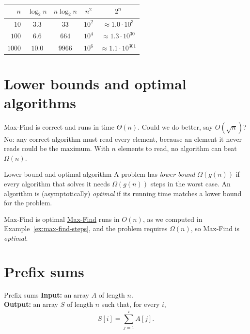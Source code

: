 \documentclass[a4paper,12pt,oneside]{report}
\begin{document}
\begin{center}
\begin{tabular}{rcccc}
  \toprule
  $n$ & $\log_2 n$ & $n\log_2 n$ & $n^2$ & $2^n$\\
  \midrule
  $10$   & $3.3$  & $33$    & $10^2$ & $\approx1.0\cdot10^{3}$\\
  $100$  & $6.6$  & $664$   & $10^4$ & $\approx1.3\cdot10^{30}$\\
  $1000$ & $10.0$ & $9966$  & $10^6$ & $\approx1.1\cdot10^{301}$\\
  \bottomrule
\end{tabular}
\end{center}

\section{Lower bounds and optimal algorithms}

Max-Find is correct and runs in time $\Theta(n)$. Could we do better,
say $O(\sqrt n)$? No: any correct algorithm must read every element,
because an element it never reads could be the maximum. With $n$
elements to read, no algorithm can beat $\Omega(n)$.

\begin{frameddefn}{Lower bound and optimal algorithm}
\label{def:optimal-algorithm}
A problem has \emph{lower bound} $\Omega(g(n))$ if every algorithm
that solves it needs $\Omega(g(n))$ steps in the worst case. An
algorithm is (asymptotically) \emph{optimal} if its running time
matches a lower bound for the problem.
\end{frameddefn}

\begin{framedexample}{Max-Find is optimal}\label{ex:max-find-optimal}
\hyperref[alg:max-find]{Max-Find} runs in $O(n)$, as we computed
in Example~\ref{ex:max-find-steps}, and the problem requires
$\Omega(n)$, so Max-Find is \emph{optimal}.
\end{framedexample}

\section{Prefix sums}

\begin{framedproblem}{Prefix sums}\label{prob:prefix-sums}
\textbf{Input:} an array $A$ of length $n$.\\
\textbf{Output:} an array $S$ of length $n$ such that, for every $i$,
\[
  S[i]=\sum_{j=1}^{i}A[j].
\]
\end{framedproblem}
\end{document}
